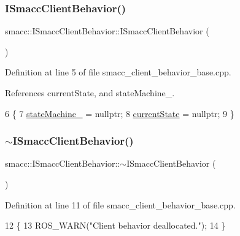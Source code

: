 \subsubsection{\texorpdfstring{I\+Smacc\+Client\+Behavior()}{ISmaccClientBehavior()}}
{\footnotesize\ttfamily smacc\+::\+I\+Smacc\+Client\+Behavior\+::\+I\+Smacc\+Client\+Behavior (\begin{DoxyParamCaption}{ }\end{DoxyParamCaption})}



Definition at line 5 of file smacc\+\_\+client\+\_\+behavior\+\_\+base.\+cpp.



References current\+State, and state\+Machine\+\_\+.


\begin{DoxyCode}
6     \{
7         \hyperlink{classsmacc_1_1ISmaccClientBehavior_a0fea65db292a8bb3dfba3e5840491d79}{stateMachine\_} = \textcolor{keyword}{nullptr};
8         \hyperlink{classsmacc_1_1ISmaccClientBehavior_a5a6658a2deb72b700ae595e594617616}{currentState} = \textcolor{keyword}{nullptr};
9     \}
\end{DoxyCode}
\mbox{\label{classsmacc_1_1ISmaccClientBehavior_a916a04c467ae5e98c5fc11909f0098f3}} 
\subsubsection{\texorpdfstring{$\sim$\+I\+Smacc\+Client\+Behavior()}{~ISmaccClientBehavior()}}
{\footnotesize\ttfamily smacc\+::\+I\+Smacc\+Client\+Behavior\+::$\sim$\+I\+Smacc\+Client\+Behavior (\begin{DoxyParamCaption}{ }\end{DoxyParamCaption})\hspace{0.3cm}{\ttfamily [virtual]}}



Definition at line 11 of file smacc\+\_\+client\+\_\+behavior\+\_\+base.\+cpp.


\begin{DoxyCode}
12     \{
13         ROS\_WARN(\textcolor{stringliteral}{"Client behavior deallocated."});
14     \}
\end{DoxyCode}


